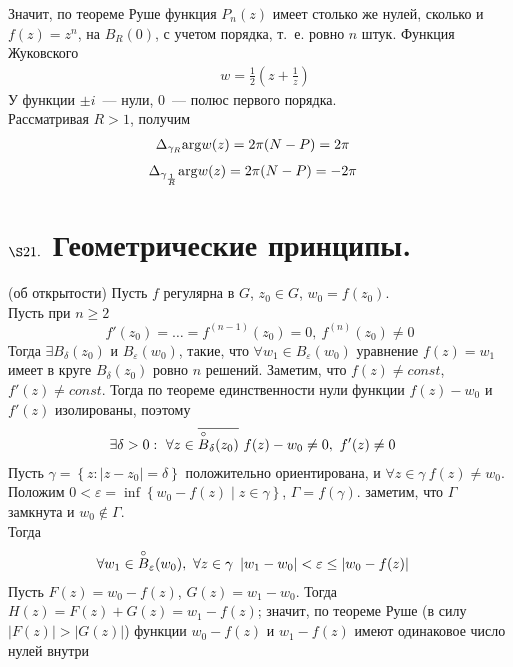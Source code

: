 Значит, по теореме Руше функция $P_n(z)$ имеет столько же нулей, сколько и $f(z)
= z^n$, на $B_R(0)$, с учетом порядка, т.~е. ровно $n$ штук.
\Example
Функция Жуковского
\begin{align*}
  & w = \frac{1}{2}\left( z+\frac{1}{z} \right)
\end{align*}
У функции $\pm i$~--- нули, $0$~--- полюс первого порядка.
\\
Рассматривая $R>1$, получим
\begin{align*}
  & \Delta_{\gamma_R}\mathrm{arg} w(z) = 2 \pi (N-P) = 2\pi
\end{align*}
\begin{align*}
  & \Delta_{\gamma_{\frac{1}{R}}}\mathrm{arg} w(z) = 2 \pi (N-P) = -2\pi
\end{align*}
\section{$\S 21.$ Геометрические принципы.}
\lemma (об открытости)
Пусть $f$ регулярна в $G$, $z_0 \in G$, $w_0 = f(z_0)$.
\\
Пусть при $n \geq 2$
\begin{equation}\label{(20.1)}
    f'(z_0) = \dots = f^{(n-1)}(z_0) = 0, \ f^{(n)}(z_0) \neq 0
\end{equation}
Тогда $\exists B_\delta(z_0)$ и $B_\varepsilon(w_0)$, такие, что $\forall w_1
\in B_{\varepsilon}(w_0)$ уравнение $f(z) = w_1$ имеет в круге $B_\delta(z_0)$
ровно $n$ решений.
\pr
Заметим, что $f(z) \neq const$, $f'(z) \neq const$. Тогда по теореме
единственности нули функции $f(z)-w_0$ и $f'(z)$ изолированы, поэтому
\begin{align*}
& \exists \delta > 0: \ \forall z \in \overline{\overset{\circ}B_\delta(z_0)} \ f(z)-w_0 \neq 0, \ f'(z) \neq 0
\end{align*}
Пусть $\gamma = \left\{ z: \left| z-z_0 \right| = \delta \right\}$ положительно
ориентирована, и $\forall z \in \gamma \ f(z)\neq w_0$. Положим $0 < \varepsilon
= \inf \left\{ w_0 - f(z) \mid z \in \gamma \right\}$, $\Gamma = f(\gamma)$.
заметим, что $\Gamma$ замкнута и $w_0 \not \in \Gamma$.
\\
Тогда
\begin{align*}
& \forall w_1 \in \overset{\circ}{B}_\varepsilon(w_0), \ \forall z \in \gamma \ \left| w_1-w_0 \right| < \varepsilon \leq \left| w_0 - f(z) \right|
\end{align*}
Пусть $F(z) = w_0 - f(z)$, $G(z) = w_1-w_0$. Тогда $H(z) = F(z)+G(z) =
w_1-f(z)$; значит, по теореме Руше (в силу $\left| F(z) \right|> \left| G(z)
\right|$) функции $w_0 - f(z)$ и $w_1-f(z)$ имеют одинаковое число нулей внутри
